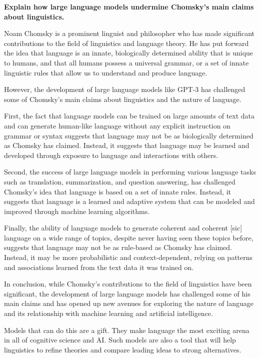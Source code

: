 \documentclass[output=paper,colorlinks,citecolor=brown
]{langscibook}
\begin{document}


\begin{myquote}
\textbf{Explain how large language models undermine Chomsky's main claims about linguistics.}

Noam Chomsky is a prominent linguist and philosopher who has made significant contributions to the field of linguistics and language theory. He has put forward the idea that language is an innate, biologically determined ability that is unique to humans, and that all humans possess a universal grammar, or a set of innate linguistic rules that allow us to understand and produce language.

However, the development of large language models like GPT-3 has challenged some of Chomsky's main claims about linguistics and the nature of language.

First, the fact that language models can be trained on large amounts of text data and can generate human-like language without any explicit instruction on grammar or syntax suggests that language may not be as biologically determined as Chomsky has claimed. Instead, it suggests that language may be learned and developed through exposure to language and interactions with others.

Second, the success of large language models in performing various language tasks such as translation, summarization, and question answering, has challenged Chomsky's idea that language is based on a set of innate rules. Instead, it suggests that language is a learned and adaptive system that can be modeled and improved through machine learning algorithms.

Finally, the ability of language models to generate coherent and coherent [sic] language on a wide range of topics, despite never having seen these topics before, suggests that language may not be as rule-based as Chomsky has claimed. Instead, it may be more probabilistic and context-dependent, relying on patterns and associations learned from the text data it was trained on.

In conclusion, while Chomsky's contributions to the field of linguistics have been significant, the development of large language models has challenged some of his main claims and has opened up new avenues for exploring the nature of language and its relationship with machine learning and artificial intelligence.
\end{myquote}
\noindent Models that can do this are a gift. They make language the most exciting arena in all of cognitive science and AI. Such models are also a tool that will help linguistics to refine theories and compare leading ideas to strong alternatives.
\end{document}
